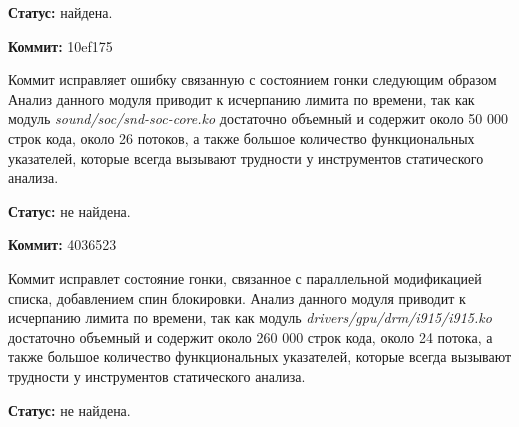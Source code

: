 \textbf{Статус:} найдена.

\vspace{1cm}

\textbf{Коммит:} 10ef175

Коммит исправляет ошибку связанную с состоянием гонки следующим образом
Анализ данного модуля приводит к исчерпанию лимита по времени, так как модуль \textit{sound/soc/snd-soc-core.ko} достаточно объемный и содержит около 50 000 строк кода, около 26 потоков, а также большое количество функциональных указателей, которые всегда вызывают трудности у инструментов статического анализа.

\textbf{Статус:} не найдена.

\vspace{1cm}

\textbf{Коммит:} 4036523

Коммит исправлет состояние гонки, связанное с параллельной модификацией списка, добавлением спин блокировки.
Анализ данного модуля приводит к исчерпанию лимита по времени, так как модуль \textit{drivers/gpu/drm/i915/i915.ko} достаточно объемный и содержит около 260 000 строк кода, около 24 потока, а также большое количество функциональных указателей, которые всегда вызывают трудности у инструментов статического анализа.

\textbf{Статус:} не найдена.



